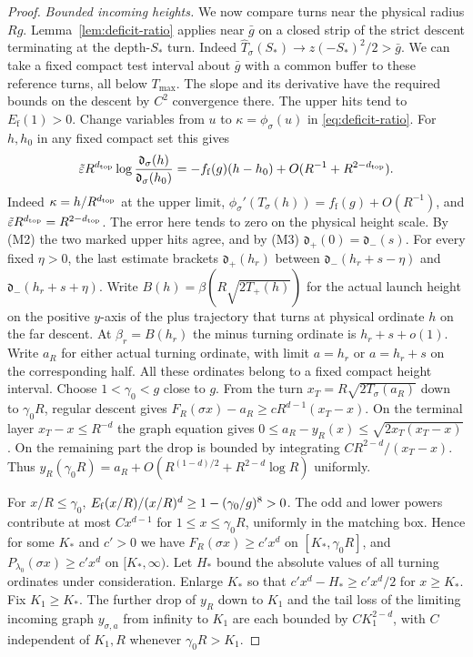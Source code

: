 \begin{proof}
\smallskip\noindent\emph{Bounded incoming heights.} We now compare turns near the physical radius
$Rg$. Lemma~\ref{lem:deficit-ratio} applies near $\bar g$ on a closed
strip of the strict descent terminating at the depth-$S_*$ turn.
Indeed $\widehat T_\sigma(S_*)\to z(-S_*)^2/2>\bar g$. We can take
a fixed compact test interval about $\bar g$ with a common buffer to
these reference turns, all below $T_{\max}$. The slope and its
derivative have the required bounds on the descent by $C^2$
convergence there. The upper hits tend to $E_{\mathrm f}(1)>0$.
Change variables from $u$ to $\kappa=\phi_\sigma(u)$ in
\eqref{eq:deficit-ratio}. For $h,h_0$ in any fixed compact set this gives
\begin{equation}\label{eq:physical-deficit}
 \tilde{\varepsilon} R^{d_{\rm top}}\log\frac{\mathfrak d_\sigma(h)}{\mathfrak d_\sigma(h_0)}
 =-f_{\mathrm f}(g)(h-h_0)
     +O(R^{-1}+R^{2-d_{\rm top}}).
\end{equation}
Indeed $\kappa=h/R^{d_{\rm top}}$ at the upper limit,
$\phi_\sigma'(T_\sigma(h))=f_{\mathrm f}(g)+O(R^{-1})$, and
$\tilde{\varepsilon} R^{d_{\rm top}}=R^{2-d_{\rm top}}$. The error here tends to zero on the physical height scale. By \textup{(M2)} the two marked upper hits agree, and by
\textup{(M3)} $\mathfrak d_+(0)=\mathfrak d_-(s)$. For every fixed $\eta>0$, the last
estimate brackets $\mathfrak d_+(h_r)$ between $\mathfrak d_-(h_r+s-\eta)$ and
$\mathfrak d_-(h_r+s+\eta)$. Write $B(h)=\beta(R\sqrt{2T_+(h)})$
for the actual launch height on the positive $y$-axis of the plus
trajectory that turns at physical ordinate $h$ on the far descent.
At $\beta_r=B(h_r)$ the minus turning ordinate is $h_r+s+o(1)$.
Write $a_R$ for either actual turning ordinate, with limit $a=h_r$
or $a=h_r+s$ on the corresponding half. All these ordinates belong
to a fixed compact height interval. Choose $1<\gamma_0<g$ close to
$g$. From the turn $x_T=R\sqrt{2T_\sigma(a_R)}$ down to $\gamma_0R$,
regular descent gives
$F_R(\sigma x)-a_R\ge cR^{d-1}(x_T-x)$. On the terminal layer
$x_T-x\le R^{-d}$ the graph equation gives
$0\le a_R-y_R(x)\le\sqrt{2x_T(x_T-x)}$. On the remaining part the
drop is bounded by integrating $CR^{2-d}/(x_T-x)$. Thus
$y_R(\gamma_0R)=a_R+O(R^{(1-d)/2}+R^{2-d}\log R)$ uniformly.

For $x/R\le\gamma_0$, $E_{\rm f}(x/R)/(x/R)^d\ge
1-(\gamma_0/g)^8>0$. The odd and lower powers contribute at most
$C x^{d-1}$ for $1\le x\le\gamma_0R$, uniformly in the matching box.
Hence for some $K_*$ and $c'>0$ we have $F_R(\sigma x)\ge c'x^d$
on $[K_*,\gamma_0R]$, and $P_{\lambda_0}(\sigma x)\ge c'x^d$ on
$[K_*,\infty)$. Let $H_*$ bound the absolute values of all turning ordinates under
consideration. Enlarge $K_*$ so that $c'x^d-H_*\ge c'x^d/2$
for $x\ge K_*$. Fix $K_1\ge K_*$. The further drop of $y_R$ down to $K_1$
and the tail loss of the limiting incoming graph $y_{\sigma,a}$ from
infinity to $K_1$ are each bounded by $C K_1^{2-d}$, with $C$
independent of $K_1,R$ whenever $\gamma_0R>K_1$.


\end{proof}
